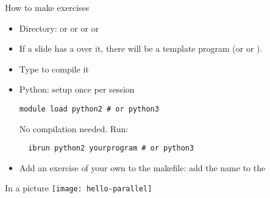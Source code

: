 \begin{frame}[containsverbatim]{How to make exercises}
  \begin{itemize}
  \item Directory:  or  or  or 
    or 
  \item If a slide has a  over it, there will be a
    template program  (or  or ).
  \item Type  to compile it
  \item Python: setup once per session
\begin{verbatim}
module load python2 # or python3
\end{verbatim}
No compilation needed. Run:
\begin{verbatim}
  ibrun python2 yourprogram # or python3
\end{verbatim}
\item Add an exercise of your own to the makefile: add the name to
    the 
  \end{itemize}
\end{frame}

\begin{exerciseframe}[hello]
  
\end{exerciseframe}

\begin{frame}{In a picture}
  \texttt{[image: hello-parallel]}
\end{frame}



